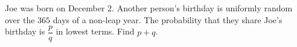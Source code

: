 Joe was born on December 2. Another person's birthday is uniformly random over the $365$ days of a non-leap year. The probability that they share Joe's birthday is $\dfrac pq$ in lowest terms. Find $p+q$.
